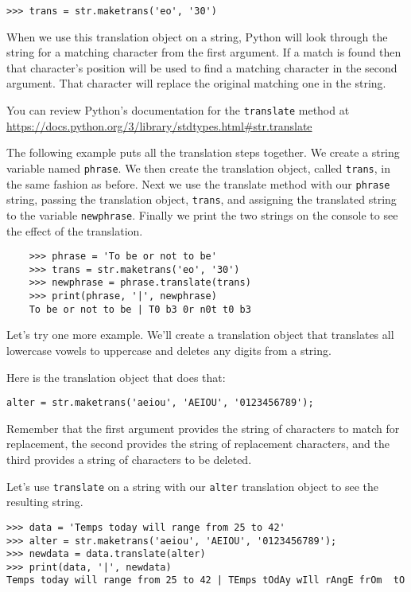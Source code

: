 \beforeverb
\begin{verbatim}
>>> trans = str.maketrans('eo', '30')
\end{verbatim}
\afterverb

When we use this translation object on a string, Python will look through the string for a matching character from the first argument. If a match is found then that character's position will be used to find a matching character in the second argument. That character will replace the original matching one in the string.

You can review Python's documentation for the {\tt translate} method at 
\url{https://docs.python.org/3/library/stdtypes.html#str.translate}

The following example puts all the translation steps together. We create a string variable named {\tt phrase}. We then create the translation object, called  {\tt trans}, in the same fashion as before. Next we use the translate method with our {\tt phrase} string, passing the translation object, {\tt trans}, and assigning the translated string to the variable {\tt newphrase}. Finally we print the two strings on the console to see the effect of the translation.

\beforeverb
\begin{verbatim}
	>>> phrase = 'To be or not to be'
	>>> trans = str.maketrans('eo', '30')
	>>> newphrase = phrase.translate(trans)
	>>> print(phrase, '|', newphrase)
	To be or not to be | T0 b3 0r n0t t0 b3
\end{verbatim}
\afterverb

Let's try one more example. We'll create a translation object that translates all lowercase vowels to uppercase and deletes any digits from a string.

Here is the translation object that does that:

\beforeverb
\begin{verbatim}
alter = str.maketrans('aeiou', 'AEIOU', '0123456789');
\end{verbatim}
\afterverb

Remember that the first argument provides the string of characters to match for replacement, the second provides the string of replacement characters, and the third provides a string of characters to be deleted.

Let's use {\tt translate} on a string with our {\tt alter} translation object to see the resulting string.

\beforeverb
\begin{verbatim}
>>> data = 'Temps today will range from 25 to 42'
>>> alter = str.maketrans('aeiou', 'AEIOU', '0123456789');
>>> newdata = data.translate(alter)
>>> print(data, '|', newdata)
Temps today will range from 25 to 42 | TEmps tOdAy wIll rAngE frOm  tO 
\end{verbatim}
\afterverb

